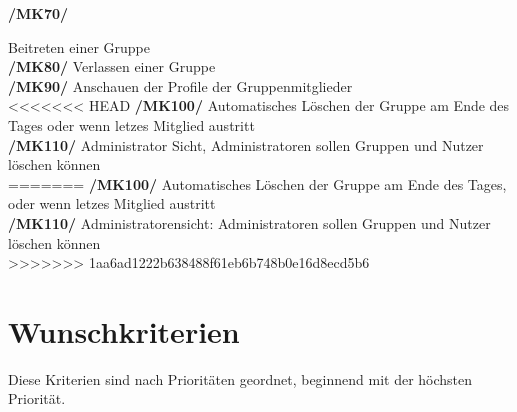 \documentclass[a4paper]{scrreprt}
\begin{document}
\begin{addmargin}[25pt]{0pt}
\hypertarget{mk70}{\textbf{/MK70/}} Beitreten einer Gruppe\\
\hypertarget{mk80}{\textbf{/MK80/}} Verlassen einer Gruppe\\
\hypertarget{mk90}{\textbf{/MK90/}} Anschauen der Profile der Gruppenmitglieder\\
<<<<<<< HEAD
\hypertarget{mk100}{\textbf{/MK100/}} Automatisches Löschen der Gruppe am Ende des Tages oder wenn letzes Mitglied austritt\\
\hypertarget{mk110}{\textbf{/MK110/}} Administrator Sicht, Administratoren sollen Gruppen und Nutzer löschen können\\
=======
\hypertarget{mk100}{\textbf{/MK100/}} Automatisches Löschen der Gruppe am Ende des Tages, oder wenn letzes Mitglied austritt\\
\hypertarget{mk110}{\textbf{/MK110/}} Administratorensicht: Administratoren sollen Gruppen und Nutzer löschen können\\
>>>>>>> 1aa6ad1222b638488f61eb6b748b0e16d8ecd5b6
\end{addmargin}

\section{Wunschkriterien}
Diese Kriterien sind nach Prioritäten geordnet, beginnend mit der höchsten Priorität.\\
\end{document}
